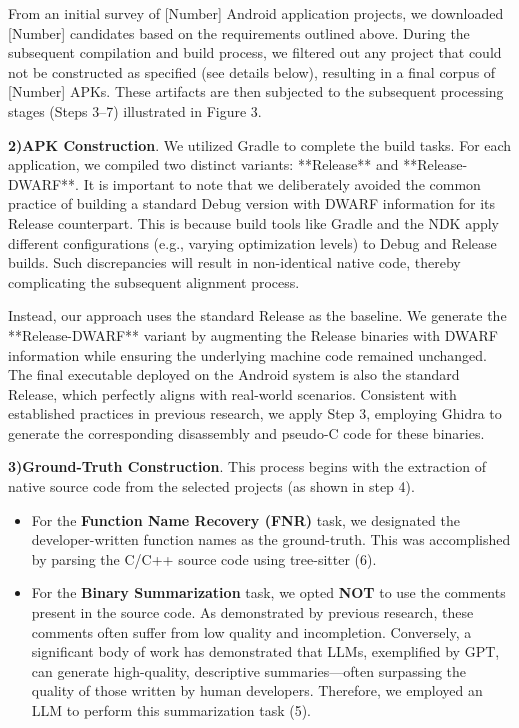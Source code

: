 \documentclass[acmsmall,screen,review,anonymous]{acmart} %
\begin{document}
From an initial survey of [Number] Android application projects, we downloaded [Number] candidates based on the requirements outlined above. During the subsequent compilation and build process, we filtered out any project that could not be constructed as specified (see details below), resulting in a final corpus of [Number] APKs. These artifacts are then subjected to the subsequent processing stages (Steps \normalsize{\textcircled{\scriptsize{3}}}\normalsize–\normalsize{\textcircled{\scriptsize{7}}}\normalsize) illustrated in Figure 3.


\textbf{2)APK Construction}. We utilized Gradle to complete the build tasks. For each application, we compiled two distinct variants: **Release** and **Release-DWARF**. It is important to note that we deliberately avoided the common practice of building a standard Debug version with DWARF information for its Release counterpart. This is because build tools like Gradle and the NDK apply different configurations (e.g., varying optimization levels) to Debug and Release builds. Such discrepancies will result in non-identical native code, thereby complicating the subsequent alignment process.

Instead, our approach uses the standard Release as the baseline. We generate the **Release-DWARF** variant by augmenting the Release binaries with DWARF information while ensuring the underlying machine code remained unchanged. The final executable deployed on the Android system is also the standard Release, which perfectly aligns with real-world scenarios. Consistent with established practices in previous research, we apply Step \normalsize{\textcircled{\scriptsize{3}}}\normalsize, employing Ghidra to generate the corresponding disassembly and pseudo-C code for these binaries.


\textbf{3)Ground-Truth Construction}. This process begins with the extraction of native source code from the selected projects (as shown in step \normalsize{\textcircled{\scriptsize{4}}}\normalsize).
\begin{itemize}
    \item For the \textbf{Function Name Recovery (FNR)} task, we designated the developer-written function names as the ground-truth. This was accomplished by parsing the C/C++ source code using tree-sitter (\normalsize{\textcircled{\scriptsize{6}}}\normalsize).
    \item For the \textbf{Binary Summarization} task, we opted \textbf{NOT} to use the comments present in the source code. As demonstrated by previous research, these comments often suffer from low quality and incompletion. Conversely, a significant body of work has demonstrated that LLMs, exemplified by GPT, can generate high-quality, descriptive summaries—often surpassing the quality of those written by human developers. Therefore, we employed an LLM to perform this summarization task (\normalsize{\textcircled{\scriptsize{5}}}\normalsize).
\end{itemize}
\end{document}
